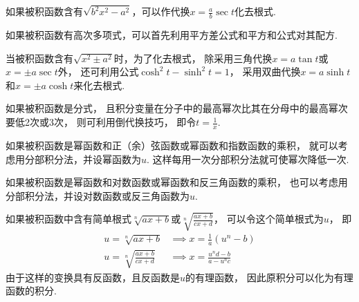 如果被积函数含有\(\sqrt{b^2 x^2 - a^2}\)，可以作代换\(x = \frac{a}{b} \sec t\)化去根式.

如果被积函数有高次多项式，可以首先利用平方差公式和平方和公式对其配方.

当被积函数含有\(\sqrt{x^2 \pm a^2}\)时，为了化去根式，
除采用三角代换\(x = a \tan t\)或\(x = \pm a \sec t\)外，
还可利用公式\(\cosh^2 t - \sinh^2 t = 1\)，
采用双曲代换\(x = a \sinh t\)和\(x = \pm a \cosh t\)来化去根式.

如果被积函数是分式，
且积分变量在分子中的最高幂次比其在分母中的最高幂次要低2次或3次，
则可利用倒代换技巧，
即令\(t=\frac{1}{x}\).

如果被积函数是幂函数和正（余）弦函数或幂函数和指数函数的乘积，
就可以考虑用分部积分法，并设幂函数为\(u\).
这样每用一次分部积分法就可使幂次降低一次.

如果被积函数是幂函数和对数函数或幂函数和反三角函数的乘积，
也可以考虑用分部积分法，并设对数函数或反三角函数为\(u\).

如果被积函数中含有简单根式\(\sqrt[n]{ax+b}\)或\(\sqrt[n]{\frac{ax+b}{cx+d}}\)，
可以令这个简单根式为\(u\)，
即\begin{align*}
	u=\sqrt[n]{ax+b} &\implies x=\frac{1}{a}(u^n-b) \\
	u=\sqrt[n]{\frac{ax+b}{cx+d}} &\implies x=\frac{u^nd-b}{a-u^nc}
\end{align*}
由于这样的变换具有反函数，且反函数是\(u\)的有理函数，
因此原积分可以化为有理函数的积分.
